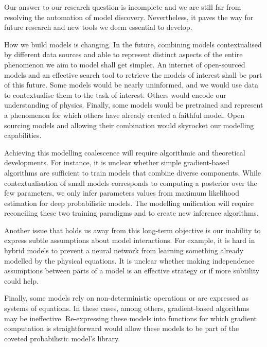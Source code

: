 Our answer to our research question is incomplete and we are still far from resolving the automation of model discovery. Nevertheless, it paves the way for future research and new tools we deem essential to develop.

How we build models is changing. In the future, combining models contextualised by different data sources and able to represent distinct aspects of the entire phenomenon we aim to model shall get simpler.
An internet of open-sourced models and an effective search tool to retrieve the models of interest shall be part of this future. Some models would be nearly uninformed, and we would use data to contextualise them to the task of interest. Others would encode our understanding of physics. Finally, some models would be pretrained and represent a phenomenon for which others have already created a faithful model.
Open sourcing models and allowing their combination would skyrocket our modelling capabilities.

Achieving this modelling coalescence will require algorithmic and theoretical developments. For instance, it is unclear whether simple gradient-based algorithms are sufficient to train models that combine diverse components. While contextualisation of small models corresponds to computing a posterior over the few parameters, we only infer parameters values from maximum likelihood estimation for deep probabilistic models. The modelling unification will require reconciling these two training paradigms and to create new inference algorithms.

Another issue that holds us away from this long-term objective is our inability to express subtle assumptions about model interactions. For example, it is hard in hybrid models to prevent a neural network from learning something already modelled by the physical equations. It is unclear whether making independence assumptions between parts of a model is an effective strategy or if more subtility could help.

Finally, some models rely on non-deterministic operations or are expressed as systems of equations. In these cases, among others, gradient-based algorithms may be ineffective. Re-expressing these models into functions for which gradient computation is straightforward would allow these models to be part of the coveted probabilistic model's library.

